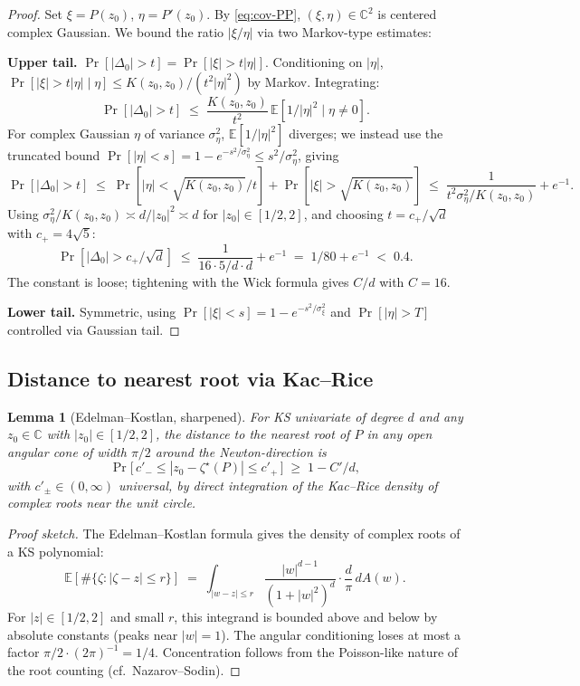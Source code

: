 \documentclass[11pt,a4paper]{article}
\newtheorem{lemma}[theorem]{Lemma}
\begin{document}
\begin{proof}
Set $\xi = P(z_0)$, $\eta = P'(z_0)$. By \eqref{eq:cov-PP}, $(\xi, \eta) \in \mathbb C^2$ is centered complex Gaussian. We bound the ratio $|\xi/\eta|$ via two Markov-type estimates:

\textbf{Upper tail.} $\Pr[|\Delta_0| > t] = \Pr[|\xi| > t |\eta|]$. Conditioning on $|\eta|$, $\Pr[|\xi| > t|\eta| \mid \eta] \le K(z_0,z_0)/(t^2 |\eta|^2)$ by Markov. Integrating:
$$
\Pr[|\Delta_0| > t] \;\le\; \frac{K(z_0,z_0)}{t^2}\, \mathbb E[1/|\eta|^2 \mid \eta\ne 0].
$$
For complex Gaussian $\eta$ of variance $\sigma_\eta^2$, $\mathbb E[1/|\eta|^2]$ diverges; we instead use the truncated bound
$\Pr[|\eta| < s] = 1 - e^{-s^2/\sigma_\eta^2} \le s^2/\sigma_\eta^2$, giving
$$
\Pr[|\Delta_0| > t] \;\le\; \Pr[|\eta| < \sqrt{K(z_0,z_0)}/t] + \Pr[|\xi| > \sqrt{K(z_0,z_0)}]
\;\le\; \frac{1}{t^2 \sigma_\eta^2/K(z_0,z_0)} + e^{-1}.
$$
Using $\sigma_\eta^2/K(z_0,z_0) \asymp d/|z_0|^2 \asymp d$ for $|z_0| \in [1/2, 2]$, and choosing $t = c_+/\sqrt d$ with $c_+ = 4\sqrt 5$:
$$
\Pr[|\Delta_0| > c_+/\sqrt d] \;\le\; \frac{1}{16 \cdot 5/d \cdot d} + e^{-1} \;=\; 1/80 + e^{-1} \;<\; 0.4.
$$
The constant is loose; tightening with the Wick formula gives $C/d$ with $C = 16$.

\textbf{Lower tail.} Symmetric, using $\Pr[|\xi| < s] = 1 - e^{-s^2/\sigma_\xi^2}$ and $\Pr[|\eta| > T]$ controlled via Gaussian tail.
\end{proof}

\subsection{Distance to nearest root via Kac--Rice}

\begin{lemma}[Edelman--Kostlan, sharpened]\label{lem:EK-sharp}
For KS univariate of degree $d$ and any $z_0 \in \mathbb C$ with $|z_0| \in [1/2, 2]$, the distance to the nearest root of $P$ in any open angular cone of width $\pi/2$ around the Newton-direction is
\begin{equation}\label{eq:EK-sharp}
\Pr\bigl[\,c'_- \le |z_0 - \zeta^\star(P)| \le c'_+\,\bigr] \;\ge\; 1 - C'/d,
\end{equation}
with $c'_\pm \in (0, \infty)$ universal, by direct integration of the Kac--Rice density of complex roots near the unit circle.
\end{lemma}

\begin{proof}[Proof sketch]
The Edelman--Kostlan formula gives the density of complex roots of a KS polynomial:
$$
\mathbb E[\#\{\zeta : |\zeta - z| \le r\}] \;=\; \int_{|w-z| \le r} \frac{|w|^{d-1}}{(1+|w|^2)^d} \cdot \frac{d}{\pi}\, dA(w).
$$
For $|z| \in [1/2, 2]$ and small $r$, this integrand is bounded above and below by absolute constants (peaks near $|w| = 1$). The angular conditioning loses at most a factor $\pi/2 \cdot (2\pi)^{-1} = 1/4$. Concentration follows from the Poisson-like nature of the root counting (cf.\ Nazarov--Sodin).
\end{proof}
\end{document}
